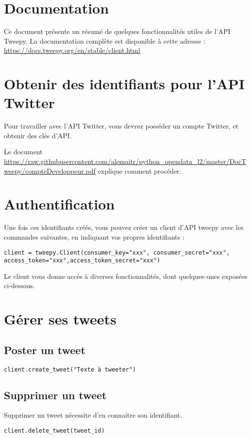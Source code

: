 \documentclass[11pt,a4paper]{article}
\begin{document}
\section*{Documentation}
Ce document présente un résumé de quelques fonctionnalités utiles de l'API Tweepy. La documentation complète est disponible à cette adresse : \url{https://docs.tweepy.org/en/stable/client.html}

\section{Obtenir des identifiants pour l'API Twitter}
Pour travailler avec l’API Twitter, vous devrez posséder un compte Twitter, et obtenir des clés d'API.

Le document \url{https://raw.githubusercontent.com/alemaitr/python_opendata_l2/master/DocTweepy/compteDeveloppeur.pdf} explique comment procéder. 

\section{Authentification}
Une fois ces identifiants créés, vous pouvez créer un client d'API tweepy avec les commandes suivantes, en indiquant vos propres identifiants  :
\begin{lstlisting}
client = tweepy.Client(consumer_key="xxx", consumer_secret="xxx", access_token="xxx",access_token_secret="xxx")
\end{lstlisting}
Le client vous donne accès à diverses fonctionnalités, dont quelques-unes  exposées ci-dessous. 
\section{Gérer ses tweets}
\subsection{Poster un tweet}

\begin{lstlisting}
client.create_tweet("Texte à tweeter")
\end{lstlisting}

\subsection{Supprimer un tweet}
Supprimer un tweet nécessite d'en connaitre son identifiant. 
\begin{lstlisting}
client.delete_tweet(tweet_id)
\end{lstlisting}
\end{document}
